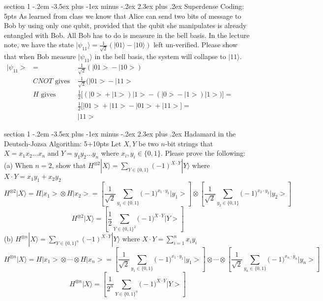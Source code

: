 \documentclass[12pt]{article}
\makeatletter
\newcommand{\<}{\langle}
\renewcommand{\>}{\rangle}
\newcommand{\kets}[1]{| #1 \rangle}                 %
\newenvironment{problem}{\@startsection
       {section}
       {1}
       {-.2em}
       {-3.5ex plus -1ex minus -.2ex}
       {2.3ex plus .2ex}
       {\pagebreak[3]
       \large\bf\noindent{Problem }
       }
       }
       {%
       \begin{center}\large\bf \end{center}}
\def\ket#1{\big|{#1}\big>}
\makeatother
\begin{document}
\begin{problem}{Superdense Coding: 5pts}
As learned from class we know that Alice can send two bits of message to Bob by using only one qubit, provided that the qubit she manipulates is already entangled with Bob. All Bob has to do is measure in the bell basis. In the lecture note, we have the state $\kets{\psi_{11}} = \frac{1}{\sqrt{2}} (\kets{01} -\kets{10})$ left un-verified. Please show that when Bob measure $\kets{\psi_{11}}$ in the bell basis, the system will collapse to $\kets{11}$.\\
$\begin{array}{cccc}
\ket{\psi_{11}} & = & \frac{1}{\sqrt{2}}(\ket{01} - \ket{10})\\
		       & CNOT \text{ gives } &\frac{1}{\sqrt{2}}(\ket{01} - \ket{11}\\
		       & H \text{ gives } &\frac{1}{2}\big[ (\ket{0} + \ket{1})\ket{1} - (\ket{0} - \ket{1})\ket{1})\big]=\\
			&&\frac{1}{2} \big[\ket{01} + \ket{11} - \ket{01} + \ket{11}\big] = \\
			&&\ket{11}
\end{array}  $
\end{problem}

\begin{problem}{Hadamard in the Deutsch-Jozsa Algorithm: 5+10pts}
Let $X, Y$ be two $n$-bit strings that $X = x_1x_2...x_n$ and $Y =y_1y_2...y_n$ where $x_i , y_i \in \{0,1\}$.  Please prove the following:\\
(a) When $n=2$, show that $H^{\otimes 2}\kets{X} = \sum_{Y \in \{0,1\}}(-1)^{X \cdot Y}\kets{Y}$ where $X\cdot Y = x_1y_1 + x_2y_2$ \\
$$H^{\otimes 2}\kets{X} = H\ket{x_1} \otimes H\ket{x_2} = \left[\frac{1}{\sqrt{2}}\sum\limits_{y_1\in\{0,1\}}\big(-1\big)^{x_1\cdot y_1}\ket{y_1}\right] 
											  \otimes \left[\frac{1}{\sqrt{2}}\sum\limits_{y_2\in\{0,1\}}\big(-1\big)^{x_2\cdot y_2}\ket{y_2}\right]$$
$$H^{\otimes 2}\kets{X} = \left[\frac{1}{2}\sum\limits_{Y\in\{0,1\}^2}\big(-1\big)^{X\cdot Y}\ket{Y}\right]$$
\noindent											  											  
(b) $H^{\otimes n}\kets{X} =  \sum_{Y \in \{0,1\}^n} (-1)^{X \cdot Y}\kets{Y}$ where $X \cdot Y = \sum_{i=1}^{n} x_iy_i$\\
$$H^{\otimes n}\kets{X} = H\ket{x_1} \otimes \cdots \otimes H\ket{x_n} = \left[\frac{1}{\sqrt{2}}\sum\limits_{y_1\in\{0,1\}}\big(-1\big)^{x_1\cdot y_1}\ket{y_1}\right] 
											  \otimes \cdots \otimes \left[\frac{1}{\sqrt{2}}\sum\limits_{y_n\in\{0,1\}}\big(-1\big)^{x_n\cdot y_n}\ket{y_n}\right]$$
$$H^{\otimes n}\kets{X} = \left[\frac{1}{2^n}\sum\limits_{Y\in\{0,1\}^n}\big(-1\big)^{X\cdot Y}\ket{Y}\right]$$
\noindent											  
\end{problem}
\newpage
\end{document}
